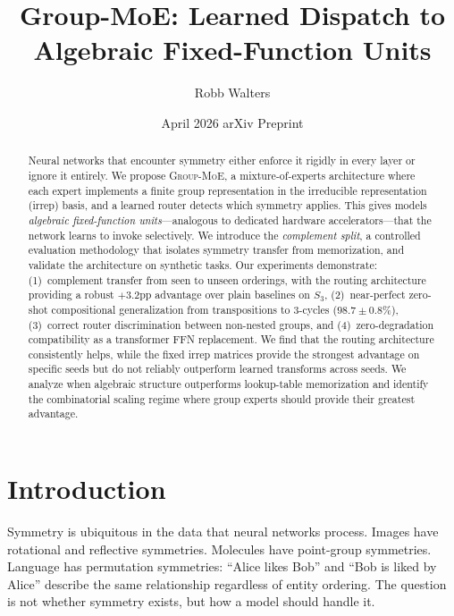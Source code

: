 \documentclass[10pt, letterpaper]{article}
\title{Group-MoE: Learned Dispatch to Algebraic Fixed-Function Units}
\author{Robb Walters}
\date{April 2026 \quad\textbar\quad arXiv Preprint}
\newcommand{\gmoe}{\textsc{Group-MoE}}
\begin{document}
\maketitle

\begin{abstract}
Neural networks that encounter symmetry either enforce it rigidly in every layer or ignore it entirely. We propose \gmoe{}, a mixture-of-experts architecture where each expert implements a finite group representation in the irreducible representation (irrep) basis, and a learned router detects which symmetry applies. This gives models \emph{algebraic fixed-function units}---analogous to dedicated hardware accelerators---that the network learns to invoke selectively. We introduce the \emph{complement split}, a controlled evaluation methodology that isolates symmetry transfer from memorization, and validate the architecture on synthetic tasks. Our experiments demonstrate: (1)~complement transfer from seen to unseen orderings, with the routing architecture providing a robust $+$3.2pp advantage over plain baselines on $S_3$, (2)~near-perfect zero-shot compositional generalization from transpositions to 3-cycles ($98.7 \pm 0.8$\%), (3)~correct router discrimination between non-nested groups, and (4)~zero-degradation compatibility as a transformer FFN replacement. We find that the routing architecture consistently helps, while the fixed irrep matrices provide the strongest advantage on specific seeds but do not reliably outperform learned transforms across seeds. We analyze when algebraic structure outperforms lookup-table memorization and identify the combinatorial scaling regime where group experts should provide their greatest advantage.
\end{abstract}

\section{Introduction}
\label{sec:intro}

Symmetry is ubiquitous in the data that neural networks process. Images have rotational and reflective symmetries. Molecules have point-group symmetries. Language has permutation symmetries: ``Alice likes Bob'' and ``Bob is liked by Alice'' describe the same relationship regardless of entity ordering. The question is not whether symmetry exists, but how a model should handle it.
\end{document}
